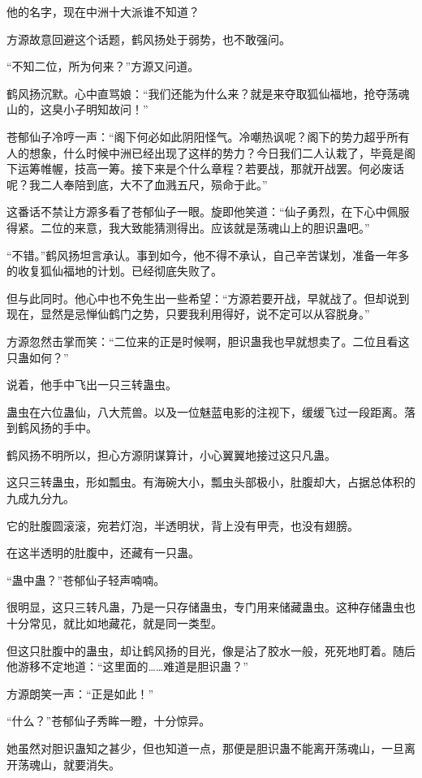 \begin{this_body}
他的名字，现在中洲十大派谁不知道？

方源故意回避这个话题，鹤风扬处于弱势，也不敢强问。

“不知二位，所为何来？”方源又问道。

鹤风扬沉默。心中直骂娘：“我们还能为什么来？就是来夺取狐仙福地，抢夺荡魂山的，这臭小子明知故问！”

苍郁仙子冷哼一声：“阁下何必如此阴阳怪气。冷嘲热讽呢？阁下的势力超乎所有人的想象，什么时候中洲已经出现了这样的势力？今日我们二人认栽了，毕竟是阁下运筹帷幄，技高一筹。接下来是个什么章程？若要战，那就开战罢。何必废话呢？我二人奉陪到底，大不了血溅五尺，殒命于此。”

这番话不禁让方源多看了苍郁仙子一眼。旋即他笑道：“仙子勇烈，在下心中佩服得紧。二位的来意，我大致能猜测得出。应该就是荡魂山上的胆识蛊吧。”

“不错。”鹤风扬坦言承认。事到如今，他不得不承认，自己辛苦谋划，准备一年多的收复狐仙福地的计划。已经彻底失败了。

但与此同时。他心中也不免生出一些希望：“方源若要开战，早就战了。但却说到现在，显然是忌惮仙鹤门之势，只要我利用得好，说不定可以从容脱身。”

方源忽然击掌而笑：“二位来的正是时候啊，胆识蛊我也早就想卖了。二位且看这只蛊如何？”

说着，他手中飞出一只三转蛊虫。

蛊虫在六位蛊仙，八大荒兽。以及一位魅蓝电影的注视下，缓缓飞过一段距离。落到鹤风扬的手中。

鹤风扬不明所以，担心方源阴谋算计，小心翼翼地接过这只凡蛊。

这只三转蛊虫，形如瓢虫。有海碗大小，瓢虫头部极小，肚腹却大，占据总体积的九成九分九。

它的肚腹圆滚滚，宛若灯泡，半透明状，背上没有甲壳，也没有翅膀。

在这半透明的肚腹中，还藏有一只蛊。

“蛊中蛊？”苍郁仙子轻声喃喃。

很明显，这只三转凡蛊，乃是一只存储蛊虫，专门用来储藏蛊虫。这种存储蛊虫也十分常见，就比如地藏花，就是同一类型。

但这只肚腹中的蛊虫，却让鹤风扬的目光，像是沾了胶水一般，死死地盯着。随后他游移不定地道：“这里面的……难道是胆识蛊？”

方源朗笑一声：“正是如此！”

“什么？”苍郁仙子秀眸一瞪，十分惊异。

她虽然对胆识蛊知之甚少，但也知道一点，那便是胆识蛊不能离开荡魂山，一旦离开荡魂山，就要消失。


\end{this_body}
